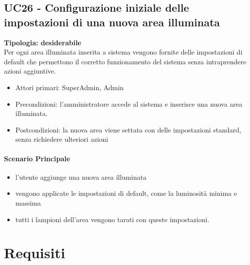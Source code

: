 \documentclass[12pt]{article}
\begin{document}
\subsection{UC26 - Configurazione iniziale delle impostazioni di una nuova area illuminata}
\textbf{Tipologia: desiderabile} \\
Per ogni area illuminata inserita a sistema vengono fornite delle impostazioni di default che permettono il corretto funzionamento del sistema senza intraprendere azioni aggiuntive.
\begin{itemize}
	\item Attori primari: SuperAdmin, Admin
	\item Precondizioni: l'amministratore accede al sistema e inserisce una nuova area illuminata.
	\item Postcondizioni: la nuova area viene settata con delle impostazioni standard, senza richiedere ulteriori azioni
\end{itemize}
\paragraph{Scenario Principale}
\begin{itemize}
	\item l'utente aggiunge una nuova area illuminata
	\item vengono applicate le impostazioni di default, come la luminosità minima e massima
	\item tutti i lampioni dell'area vengono tarati con queste impostazioni.
\end{itemize}


\section{Requisiti}
\end{document}
